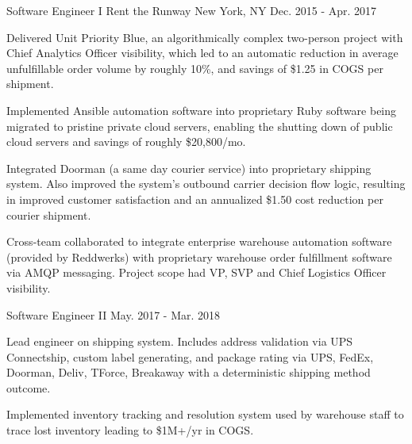 
\begin{cventries}

  \cventry
    {Software Engineer I} %
    {Rent the Runway} %
    {New York, NY} %
    {Dec. 2015 - Apr. 2017} %
    {
      \begin{cvitems} %
        \item {Delivered Unit Priority Blue, an algorithmically complex two-person project with Chief Analytics Officer visibility, which led to an automatic reduction in average unfulfillable order volume by roughly 10\%, and savings of \$1.25 in COGS per shipment.}
        \item {Implemented Ansible automation software into proprietary Ruby software being migrated to pristine private cloud servers, enabling the shutting down of public cloud servers and savings of roughly \$20,800/mo.}
        \item {Integrated Doorman (a same day courier service) into proprietary shipping system. Also improved the system's outbound carrier decision flow logic, resulting in improved customer satisfaction and an annualized \$1.50 cost reduction per courier shipment.}
        \item {Cross-team collaborated to integrate enterprise warehouse automation software (provided by Reddwerks) with proprietary warehouse order fulfillment software via AMQP messaging. Project scope had VP, SVP and Chief Logistics Officer visibility.}
      \end{cvitems}
    }


  \cventry
    {Software Engineer II} %
    {} %
    {} %
    {May. 2017 - Mar. 2018} %
    {
      \begin{cvitems} %
        \item {Lead engineer on shipping system. Includes address validation via UPS Connectship, custom label generating, and package rating via UPS, FedEx, Doorman, Deliv, TForce, Breakaway with a deterministic shipping method outcome.} %
        \item {Implemented inventory tracking and resolution system used by warehouse staff to trace lost inventory leading to \$1M+/yr in COGS.} %
      \end{cvitems}
    }


\end{cventries}
